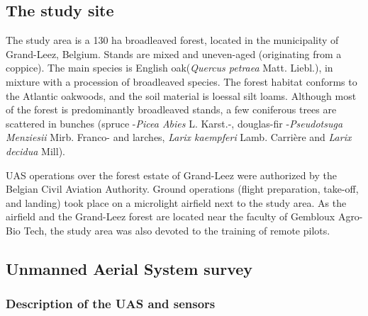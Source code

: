 \documentclass[remotesensing,article,submit,moreauthors,pdftex,12pt,a4paper]{mdpi} %
\begin{document}
\subsection{The study site}

The study area is a 130 ha broadleaved forest, located in the municipality of Grand-Leez, Belgium. 
Stands are mixed and uneven-aged (originating from a coppice). 
The main species is English oak(\textit{Quercus petraea} Matt. Liebl.), in mixture with a procession of broadleaved species. 
The forest habitat conforms to the Atlantic oakwoods, and the soil material is loessal silt loams. 
Although most of the forest is predominantly broadleaved stands, a few coniferous trees are scattered in bunches (spruce -\textit{Picea Abies} L. Karst.-, douglas-fir -\textit{Pseudotsuga Menziesii} Mirb. Franco- and larches, \textit{Larix kaempferi} Lamb. Carrière and \textit{Larix decidua} Mill).

UAS operations over the forest estate of Grand-Leez were authorized by the Belgian Civil Aviation Authority. 
Ground operations (flight preparation, take-off, and landing) took place on a microlight airfield next to the study area. 
As the airfield and the Grand-Leez forest are located near the faculty of Gembloux Agro-Bio Tech, the study area was also devoted to the training of remote pilots. 


\subsection{Unmanned Aerial System survey}

\subsubsection{Description of the UAS and sensors}
\end{document}
